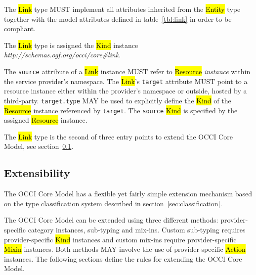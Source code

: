 \documentclass[10pt,a4paper]{article}
\begin{document}
The \hl{Link} type MUST implement all attributes inherited from the
\hl{Entity} type together with the model attributes defined in
table~\ref{tbl:link} in order to be compliant.


The \hl{Link} type is assigned the \hl{Kind} instance
\textit{http://schemas.ogf.org/occi/core\#link}.

The {\tt source} attribute of a \hl{Link} instance
MUST refer to \hl{Resource} {\em instance} within the service provider's
namespace. The \hl{Link}'s {\tt target} attribute MUST point to a resource instance either within the provider's namespace or outside,
hosted by a third-party. {\tt target.type} MAY be used to explicitly define the \hl{Kind} of the \hl{Resource}
instance referenced by {\tt target}. The {\tt source} \hl{Kind} is specified by the assigned \hl{Resource} instance.

The \hl{Link} type is the second of three entry points to extend the
OCCI Core Model, see section~\ref{sec:extensibility}.


\subsection{Extensibility}
\label{sec:extensibility}
The OCCI Core Model has a flexible yet fairly simple extension
mechanism based on the type classification system described in
section~\ref{sec:classification}.

The OCCI Core Model can be extended using three different methods:
provider-specific category instances, sub-typing and mix-ins. Custom sub-typing requires provider-specific
\hl{Kind} instances and custom mix-ins require provider-specific
\hl{Mixin} instances. Both methods MAY involve the use of
provider-specific \hl{Action} instances.
The following sections
define the rules for extending the OCCI Core Model.
\end{document}
